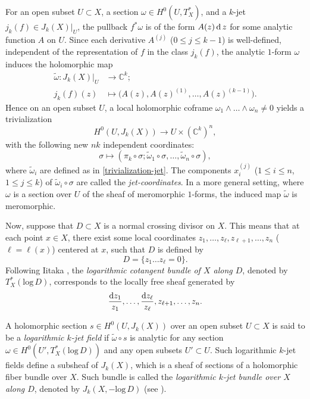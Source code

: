 \documentclass[english, 12pt]{amsart}
\DeclareMathOperator{\dif}{\text{\normalfont d}}
\def\log{\mathrm{log}\,}
\theoremstyle{plain}
\theoremstyle{remark}
\numberwithin{equation}{section}
\theoremstyle{plain}
\theoremstyle{named}
\begin{document}
For an open subset $U\subset X$, a section $\omega\in H^0(U,T_X^*)$, and a $k$-jet $j_k(f)\in J_k(X)|_U$, the pullback $f^*\omega$ is of the form $A(z)\dif z$ for some analytic function $A$ on $U$. Since each derivative $A^{(j)}$ ($0\leq j\leq k-1$) is well-defined, independent of the representation of $f$ in the class $j_k(f)$, the analytic $1$-form $\omega$ induces the holomorphic map
\begin{align}
	\label{trivialization-jet}
	\tilde{\omega}
	\colon
	J_k(X)|_U &
	\rightarrow
	\mathbb{C}^k;\nonumber\\
	j_k(f)(z)&\mapsto
	\big(A(z),A(z)^{(1)},\dots,A(z)^{(k-1)}
	\big).
\end{align}
Hence on an open subset $U$, a local holomorphic coframe $\omega_1\wedge\dots\wedge\omega_n\not=0$ yields a trivialization 
\[
H^0(U, J_k(X))\rightarrow U\times(\mathbb{C}^k)^n,
\]
with the following new $n k$ independent coordinates:
\[
\sigma\mapsto(\pi_k\circ\sigma;\tilde{\omega}_1\circ\sigma,\dots,\tilde{\omega}_n\circ\sigma),
\]
where $\tilde{\omega}_i$ are defined as in \eqref{trivialization-jet}. The components $x_i^{(j)}$ ($1\leq i\leq n$, $1\leq j\leq k$) of $\tilde{\omega}_i\circ\sigma$ are called the {\sl jet-coordinates}.
In a more general setting, where $\omega$ is a section over $U$ of the sheaf of meromorphic $1$-forms, the induced map $\tilde{\omega}$ is meromorphic.

Now, suppose that $D\subset X$ is a normal crossing divisor on $X$. This means that at each point $x\in X$, there exist some local coordinates $z_1,\dots,z_{\ell},z_{\ell+1},\dots,z_n$ ($\ell=\ell(x)$) centered at $x$, such that $D$ is defined by
\[
D=
\{z_1\dots z_{\ell}=0
\}.
\]
Following Iitaka \cite{Itaka82}, the {\sl logarithmic cotangent bundle of $X$ along $D$}, denoted by $T_X^*(\log D)$, corresponds to the locally free sheaf generated by
\[
\dfrac{\dif\!z_1}{z_1},\dots,\dfrac{\dif\! z_{\ell}}{z_{\ell}},z_{\ell +1},\dots,z_n.
\]

A holomorphic section $s\in H^0(U,J_k(X))$ over an open subset $U\subset X$ is said to be a {\sl logarithmic $k$-jet field} if $\tilde{\omega}\circ s$ is analytic for any section $\omega\in H^0(U',T_X^*(\log D))$ and any open subsets $U'\subset U$. Such logarithmic $k$-jet fields define a subsheaf of $J_k(X)$, which is a sheaf of sections of a holomorphic fiber bundle over $X$. Such bundle is called the {\sl logarithmic $k$-jet bundle over $X$ along $D$}, denoted by $J_k(X,-\log D)$ (see \cite{Noguchi1986}).
\end{document}
